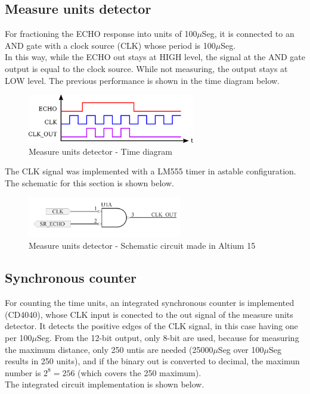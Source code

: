\subsection*{Measure units detector}

For fractioning the ECHO response into units of 100$\mu$Seg, it is 
connected to an AND gate with a clock source (CLK) whose period is 100$\mu$Seg.\\
In this way, while the ECHO out stays at HIGH level, the signal at the AND gate output 
is equal to the clock source. While not measuring, the output stays at LOW level.
The previous performance is shown in the time diagram below.

\begin{figure}[H]
    \begin{centering}
    \includegraphics[width=0.65\textwidth]{data/CLK_time}
    \par\end{centering}
    \caption{Measure units detector - Time diagram}
\end{figure}

The CLK signal was implemented with a LM555 timer in astable configuration.
The schematic for this section is shown below.

\begin{figure}[H]
    \begin{centering}
    \includegraphics[width=0.6\textwidth]{data/Unit_Detector}
    \par\end{centering}
    \caption{Measure units detector - Schematic circuit made in Altium 15}
\end{figure}

\subsection*{Synchronous counter}

For counting the time units, an integrated synchronous counter is implemented (CD4040), 
whose CLK input is conected to the out signal of the measure units detector. It detects the 
positive edges of the CLK signal, in this case having one per 100$\mu$Seg. From the 12-bit 
output, only 8-bit are used, because for measuring the maximum distance, only 250 untis are 
needed (25000$\mu$Seg over 100$\mu$Seg results in 250 units), and if the binary out is converted 
to decimal, the maximun number is $2^8 = 256$ (which covers the 250 maximum).\\
The integrated circuit implementation is shown below.

